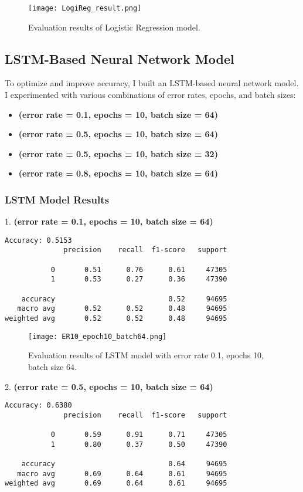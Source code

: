 \begin{figure}[h!]
    \centering
    \texttt{[image: LogiReg\_result.png]}
    \caption{Evaluation results of Logistic Regression model.}
    \label{fig:logreg_results}
\end{figure}

\subsection{LSTM-Based Neural Network Model}

To optimize and improve accuracy, I built an LSTM-based neural network model. I experimented with various combinations of error rates, epochs, and batch sizes:

\begin{itemize}
    \item \textbf{(error rate = 0.1, epochs = 10, batch size = 64)}
    \item \textbf{(error rate = 0.5, epochs = 10, batch size = 64)}
    \item \textbf{(error rate = 0.5, epochs = 10, batch size = 32)}
    \item \textbf{(error rate = 0.8, epochs = 10, batch size = 64)}
\end{itemize}

\subsubsection{LSTM Model Results}

1. \textbf{(error rate = 0.1, epochs = 10, batch size = 64)}
\begin{verbatim}
Accuracy: 0.5153
              precision    recall  f1-score   support

           0       0.51      0.76      0.61     47305
           1       0.53      0.27      0.36     47390

    accuracy                           0.52     94695
   macro avg       0.52      0.52      0.48     94695
weighted avg       0.52      0.52      0.48     94695
\end{verbatim}

\begin{figure}[h!]
    \centering
    \texttt{[image: ER10\_epoch10\_batch64.png]}
    \caption{Evaluation results of LSTM model with error rate 0.1, epochs 10, batch size 64.}
    \label{fig:lstm_results_0.1_10_64}
\end{figure}

2. \textbf{(error rate = 0.5, epochs = 10, batch size = 64)}
\begin{verbatim}
Accuracy: 0.6380
              precision    recall  f1-score   support

           0       0.59      0.91      0.71     47305
           1       0.80      0.37      0.50     47390

    accuracy                           0.64     94695
   macro avg       0.69      0.64      0.61     94695
weighted avg       0.69      0.64      0.61     94695
\end{verbatim}

